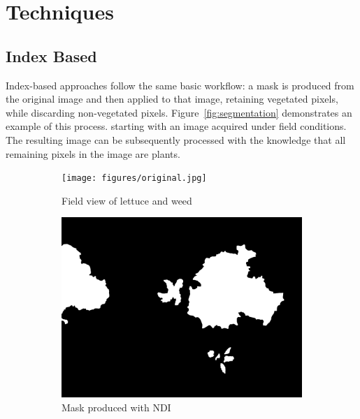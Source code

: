 \documentclass[letterpaper]{article}
\begin{document}
\section{Techniques}
\subsection{Index Based}
Index-based approaches follow the same basic workflow: a mask is produced from the original image and then applied to that image, retaining vegetated pixels, while discarding non-vegetated pixels. Figure~\ref{fig:segmentation} demonstrates an example of this process. starting with an image acquired under field conditions. The resulting image can be subsequently processed with the knowledge that all remaining pixels in the image are plants.

\begin{figure}[H]
	\centering
	\begin{subfigure}[h]{.30\textwidth}
	  \centering
	  \texttt{[image: figures/original.jpg]}
	  \caption{Field view of lettuce and weed}
	  \label{fig:original}
	\end{subfigure}
	\begin{subfigure}[h]{.30\textwidth}
	  \centering
	  \includegraphics[width=1\linewidth]{figures/original-mask.jpg}
	  \caption{Mask produced with NDI}
	  \label{fig:mask}
	\end{subfigure}
	\begin{subfigure}[h]{.30\textwidth}
	  \centering

\end{subfigure}
\end{figure}
\end{document}
